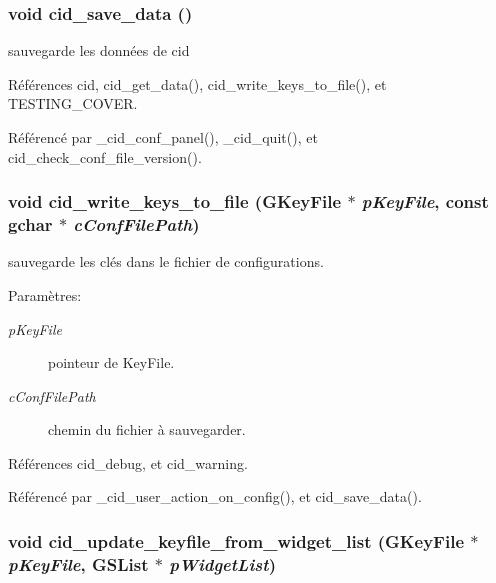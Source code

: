 \subsubsection{\setlength{\rightskip}{0pt plus 5cm}void cid\_\-save\_\-data ()}\label{cid-config_8c_a924ec2e21de1e288a0fb06a7ec71e90}


sauvegarde les données de cid 

Références cid, cid\_\-get\_\-data(), cid\_\-write\_\-keys\_\-to\_\-file(), et TESTING\_\-COVER.

Référencé par \_\-cid\_\-conf\_\-panel(), \_\-cid\_\-quit(), et cid\_\-check\_\-conf\_\-file\_\-version().
\subsubsection{\setlength{\rightskip}{0pt plus 5cm}void cid\_\-write\_\-keys\_\-to\_\-file (GKeyFile $\ast$ {\em pKeyFile}, \/  const gchar $\ast$ {\em cConfFilePath})}\label{cid-config_8c_bde2f6a9c4d72b55999544d4d823d75a}


sauvegarde les clés dans le fichier de configurations. \begin{Desc}
\item[Paramètres:]
\begin{description}
\item[{\em pKeyFile}]pointeur de KeyFile. \item[{\em cConfFilePath}]chemin du fichier à sauvegarder. \end{description}
\end{Desc}


Références cid\_\-debug, et cid\_\-warning.

Référencé par \_\-cid\_\-user\_\-action\_\-on\_\-config(), et cid\_\-save\_\-data().
\subsubsection{\setlength{\rightskip}{0pt plus 5cm}void cid\_\-update\_\-keyfile\_\-from\_\-widget\_\-list (GKeyFile $\ast$ {\em pKeyFile}, \/  GSList $\ast$ {\em pWidgetList})}\label{cid-config_8c_b0b7d2c2182a54ad3ae6fd16f7b3978a}




